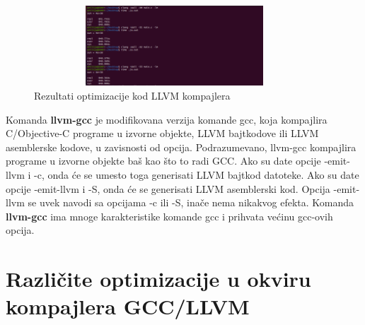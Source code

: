 \documentclass[a4paper]{article}
\begin{document}
\begin{figure}[h!]
    \begin{center}
        \includegraphics[width=105mm, height=30mm]{pics/test2.png}
    \end{center}
    \caption {Rezultati optimizacije kod LLVM kompajlera}
    \label{fig:Rezultati_optimizacije2}

\end{figure}

\newpage

Komanda \textbf{llvm-gcc} je modifikovana verzija komande gcc, koja ko\-mpajlira C/Objective-C programe u izvorne objekte, LLVM bajtkodove ili LLVM asemblerske kodove, u zavisnosti od opcija. Podrazumevano, llvm-gcc kompajlira programe u izvorne objekte baš kao što to radi GCC. Ako su date opcije -emit-llvm i -c, onda će se umesto toga generisati LLVM bajtkod datoteke. Ako su date opcije -emit-llvm i -S, onda će se generisati LLVM asemblerski kod. Opcija -emit-llvm se uvek navodi sa opcijama -c ili -S, inače nema nikakvog efekta. Komanda \textbf{llvm-gcc} ima mnoge kara\-kteristike komande gcc i prihvata većinu gcc-ovih opcija.\cite{llvm-gcc}

\section{Različite optimizacije u okviru kompajlera GCC/LLVM}
\label{subsec:razlike}
\end{document}

